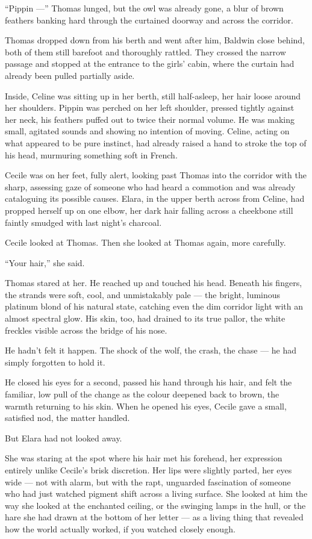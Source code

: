 \enquote{Pippin ---} Thomas lunged, but the owl was already gone, a blur of brown feathers banking hard through the curtained doorway and across the corridor.

Thomas dropped down from his berth and went after him, Baldwin close behind, both of them still barefoot and thoroughly rattled. They crossed the narrow passage and stopped at the entrance to the girls' cabin, where the curtain had already been pulled partially aside.

Inside, Celine was sitting up in her berth, still half-asleep, her hair loose around her shoulders. Pippin was perched on her left shoulder, pressed tightly against her neck, his feathers puffed out to twice their normal volume. He was making small, agitated sounds and showing no intention of moving. Celine, acting on what appeared to be pure instinct, had already raised a hand to stroke the top of his head, murmuring something soft in French.

Cecile was on her feet, fully alert, looking past Thomas into the corridor with the sharp, assessing gaze of someone who had heard a commotion and was already cataloguing its possible causes. Elara, in the upper berth across from Celine, had propped herself up on one elbow, her dark hair falling across a cheekbone still faintly smudged with last night's charcoal.

Cecile looked at Thomas. Then she looked at Thomas again, more carefully.

\enquote{Your hair,} she said.

Thomas stared at her. He reached up and touched his head. Beneath his fingers, the strands were soft, cool, and unmistakably pale --- the bright, luminous platinum blond of his natural state, catching even the dim corridor light with an almost spectral glow. His skin, too, had drained to its true pallor, the white freckles visible across the bridge of his nose.

He hadn't felt it happen. The shock of the wolf, the crash, the chase --- he had simply forgotten to hold it.

He closed his eyes for a second, passed his hand through his hair, and felt the familiar, low pull of the change as the colour deepened back to brown, the warmth returning to his skin. When he opened his eyes, Cecile gave a small, satisfied nod, the matter handled.

But Elara had not looked away.

She was staring at the spot where his hair met his forehead, her expression entirely unlike Cecile's brisk discretion. Her lips were slightly parted, her eyes wide --- not with alarm, but with the rapt, unguarded fascination of someone who had just watched pigment shift across a living surface. She looked at him the way she looked at the enchanted ceiling, or the swinging lamps in the hull, or the hare she had drawn at the bottom of her letter --- as a living thing that revealed how the world actually worked, if you watched closely enough.

